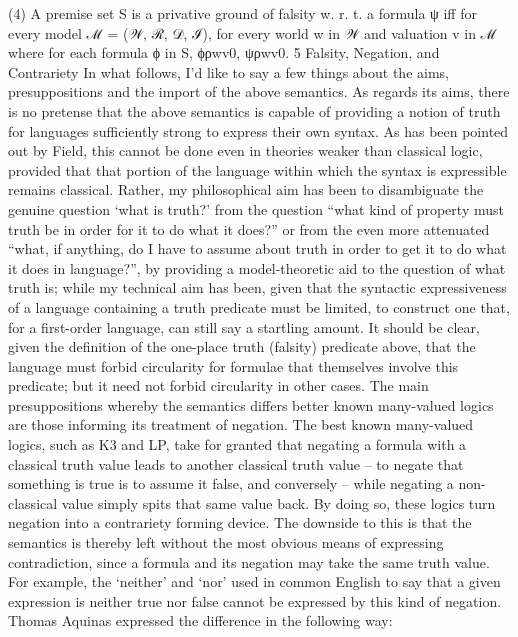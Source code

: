 \documentclass[]{article}
\begin{document}
(4)	A premise set S is a privative ground of falsity w. r. t. a formula ψ iff for every model ℳ = (𝒲, ℛ, 𝒟, ℐ), for every world w in 𝒲 and valuation v in ℳ where for each formula ϕ in S, ϕρwv0, ψρwv0.
5 Falsity, Negation, and Contrariety
In what follows, I’d like to say a few things about the aims, presuppositions and the import of the above semantics. 
As regards its aims, there is no pretense that the above semantics is capable of providing a notion of truth for languages sufficiently strong to express their own syntax. As has been pointed out by Field,  this cannot be done even in theories weaker than classical logic, provided that that portion of the language within which the syntax is expressible remains classical.
Rather, my philosophical aim has been to disambiguate the genuine question ‘what is truth?’ from the question “what kind of property must truth be in order for it to do what it does?”  or from the even more attenuated “what, if anything, do I have to assume about truth in order to get it to do what it does in language?”,  by providing a model-theoretic aid to the question of what truth is; while my technical aim has been, given that the syntactic expressiveness of a language containing a truth predicate must be limited, to construct one that, for a first-order language, can still say a startling amount.
It should be clear, given the definition of the one-place truth (falsity) predicate above, that the language must forbid circularity for formulae that themselves involve this predicate;  but it need not forbid circularity in other cases. 
The main presuppositions whereby the semantics differs better known many-valued logics are those informing its treatment of negation. The best known many-valued logics, such as K3 and LP, take for granted that negating a formula with a classical truth value leads to another classical truth value – to negate that something is true is to assume it false, and conversely – while negating a non-classical value simply spits that same value back. By doing so, these logics turn negation into a contrariety forming device. The downside to this is that the semantics is thereby left without the most obvious means of expressing contradiction, since a formula and its negation may take the same truth value. For example, the ‘neither’ and ‘nor’ used in common English to say that a given expression is neither true nor false cannot be expressed by this kind of negation. 
Thomas Aquinas expressed the difference in the following way:
\end{document}

